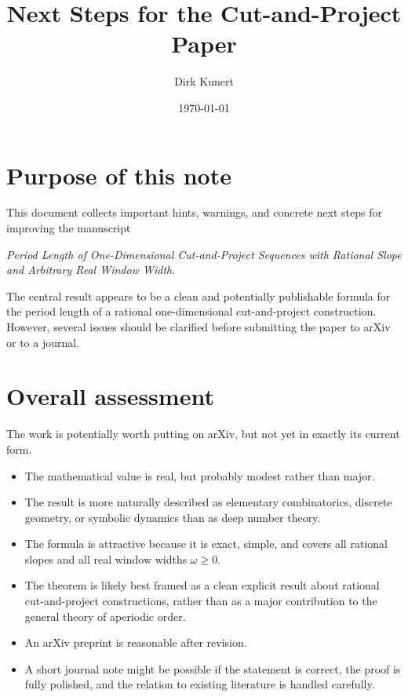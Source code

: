 \documentclass[11pt]{article}
\title{Next Steps for the Cut-and-Project Paper}
\author{Dirk Kunert}
\date{\today}
\begin{document}
\maketitle

\section*{Purpose of this note}

This document collects important hints, warnings, and concrete next steps
for improving the manuscript

\begin{center}
\emph{Period Length of One-Dimensional Cut-and-Project Sequences
with Rational Slope and Arbitrary Real Window Width}.
\end{center}

The central result appears to be a clean and potentially publishable formula
for the period length of a rational one-dimensional cut-and-project
construction.  However, several issues should be clarified before submitting
the paper to arXiv or to a journal.

\section*{Overall assessment}

The work is potentially worth putting on arXiv, but not yet in exactly its
current form.

\begin{itemize}
    \item The mathematical value is real, but probably modest rather than
    major.

    \item The result is more naturally described as elementary combinatorics,
    discrete geometry, or symbolic dynamics than as deep number theory.

    \item The formula is attractive because it is exact, simple, and covers
    all rational slopes and all real window widths \(\omega \ge 0\).

    \item The theorem is likely best framed as a clean explicit result about
    rational cut-and-project constructions, rather than as a major
    contribution to the general theory of aperiodic order.

    \item An arXiv preprint is reasonable after revision.

    \item A short journal note might be possible if the statement is correct,
    the proof is fully polished, and the relation to existing literature is
    handled carefully.
\end{itemize}
\end{document}
